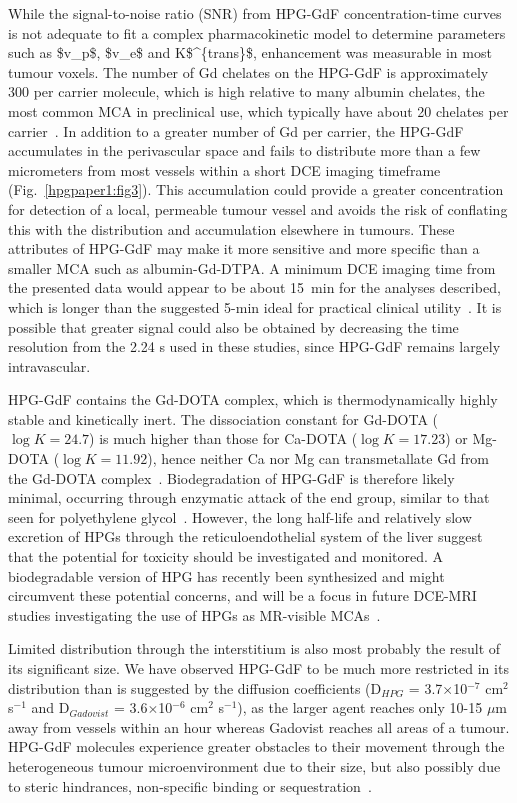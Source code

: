 While the signal-to-noise ratio (\acs{SNR}) from \acs{HPG-GdF} concentration-time curves is not adequate to fit a complex pharmacokinetic model to determine parameters such as \acs{$v_p$}, \acs{$v_e$} and \acs{K$^{trans}$}, enhancement was measurable in most tumour voxels.
The number of Gd chelates on the \acs{HPG-GdF} is approximately 300 per carrier molecule, which is high relative to many albumin chelates, the most common \acs{MCA} in preclinical use, which typically have about 20 chelates per carrier~\cite{Ogan:1987tg}.
In addition to a greater number of Gd per carrier, the \acs{HPG-GdF} accumulates in the perivascular space and fails to distribute more than a few micrometers from most vessels within a short DCE imaging timeframe (Fig.~\ref{hpgpaper1:fig3}).
This accumulation could provide a greater concentration for detection of a local, permeable tumour vessel and avoids the risk of conflating this with the distribution and accumulation elsewhere in tumours.
These attributes of \acs{HPG-GdF} may make it more sensitive and more specific than a smaller \acs{MCA} such as albumin-Gd-DTPA.
A minimum DCE imaging time from the presented data would appear to be about 15~min for the analyses described, which is longer than the suggested 5-min ideal for practical clinical utility~\cite{Turetschek:2004bw}.
It is possible that greater signal could also be obtained by decreasing the time resolution from the 2.24 s used in these studies, since \acs{HPG-GdF} remains largely intravascular.

\acs{HPG-GdF} contains the Gd-\acs{DOTA} complex, which is thermodynamically highly  stable and kinetically inert.
The dissociation constant for Gd-\acs{DOTA} ($\log K = 24.7$) is much higher than those for Ca-\acs{DOTA} ($\log K = 17.23$) or Mg-\acs{DOTA} ($\log K = 11.92$), hence neither Ca nor Mg can transmetallate Gd from the Gd-\acs{DOTA} complex~\cite{Baranyai:2005ta}.
Biodegradation of \acs{HPG-GdF} is therefore likely minimal, occurring through enzymatic attack of the end group, similar to that seen for polyethylene glycol~\cite{Kawai:2002fc}.
However, the long half-life and relatively slow excretion of HPGs through the reticuloendothelial system of the liver suggest that the potential for toxicity should be investigated and monitored.
A biodegradable version of HPG has recently been synthesized and might circumvent these potential concerns, and will be a focus in future \acs{DCE-MRI} studies investigating the use of HPGs as MR-visible \acs{MCA}s~\cite{Shenoi:2013id}.

Limited distribution through the interstitium is also most probably the result of its significant size.
We have observed \acs{HPG-GdF} to be much more restricted in its distribution than is suggested by the diffusion coefficients (D$_{HPG}$ = 3.7$\times$10$^{-7}$ cm$^2$ s$^{-1}$ and D$_{Gadovist}$ = 3.6$\times$10$^{-6}$ cm$^2$ s$^{-1}$), as the larger agent reaches only 10-15 $\mu$m away from vessels within an hour whereas Gadovist reaches all areas of a tumour.
\acs{HPG-GdF} molecules experience greater obstacles to their movement through the heterogeneous tumour microenvironment due to their size, but also possibly due to steric hindrances, non-specific binding or sequestration~\cite{Minchinton:2006gs}.

